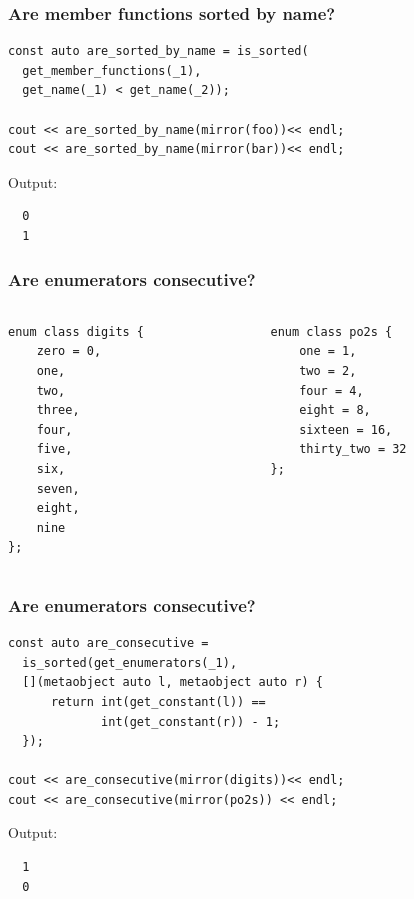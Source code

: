 \documentclass[compress,table,xcolor=table]{beamer}
\begin{document}
\begin{frame}[fragile]
  \frametitle{Are member functions sorted by name?}
  \begin{lstlisting}[language=c++2x,basicstyle=\small\ttfamily]
const auto are_sorted_by_name = is_sorted(
  get_member_functions(_1),
  get_name(_1) < get_name(_2));

cout << are_sorted_by_name(mirror(foo))<< endl;
cout << are_sorted_by_name(mirror(bar))<< endl;
  \end{lstlisting}
  Output:
  \begin{verbatim}
  0
  1
  \end{verbatim}
\end{frame}
\begin{frame}[fragile]
  \frametitle{Are enumerators consecutive?}
  \begin{columns}
    \begin{column}{.43\textwidth}
      \begin{lstlisting}[language=c++2x,basicstyle=\small\ttfamily]
enum class digits {
    zero = 0,
    one,
    two,
    three,
    four,
    five,
    six,
    seven,
    eight,
    nine
};
      \end{lstlisting}
    \end{column}
    \begin{column}{.47\textwidth}
      \begin{lstlisting}[language=c++2x,basicstyle=\small\ttfamily]
enum class po2s {
    one = 1,
    two = 2,
    four = 4,
    eight = 8,
    sixteen = 16,
    thirty_two = 32
};
      \end{lstlisting}
    \end{column}
  \end{columns}
\end{frame}
\begin{frame}[fragile]
  \frametitle{Are enumerators consecutive?}
  \begin{lstlisting}[language=c++2x,basicstyle=\small\ttfamily]
const auto are_consecutive =
  is_sorted(get_enumerators(_1),
  [](metaobject auto l, metaobject auto r) {
      return int(get_constant(l)) ==
             int(get_constant(r)) - 1;
  });

cout << are_consecutive(mirror(digits))<< endl;
cout << are_consecutive(mirror(po2s)) << endl;
  \end{lstlisting}
  Output:
  \begin{verbatim}
  1
  0
  \end{verbatim}
\end{frame}
\end{document}
